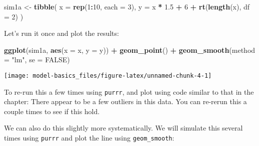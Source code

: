 \documentclass[]{book}
\newenvironment{Shaded}{\begin{snugshade}}{\end{snugshade}}
\newcommand{\DataTypeTok}[1]{\textcolor[rgb]{0.13,0.29,0.53}{#1}}
\newcommand{\DecValTok}[1]{\textcolor[rgb]{0.00,0.00,0.81}{#1}}
\newcommand{\FloatTok}[1]{\textcolor[rgb]{0.00,0.00,0.81}{#1}}
\newcommand{\KeywordTok}[1]{\textcolor[rgb]{0.13,0.29,0.53}{\textbf{#1}}}
\newcommand{\NormalTok}[1]{#1}
\newcommand{\OperatorTok}[1]{\textcolor[rgb]{0.81,0.36,0.00}{\textbf{#1}}}
\newcommand{\OtherTok}[1]{\textcolor[rgb]{0.56,0.35,0.01}{#1}}
\newcommand{\StringTok}[1]{\textcolor[rgb]{0.31,0.60,0.02}{#1}}
\theoremstyle{definition}
\theoremstyle{definition}
\theoremstyle{definition}
\theoremstyle{remark}
\begin{document}
\begin{Shaded}
\begin{Highlighting}[]
\NormalTok{sim1a <-}\StringTok{ }\KeywordTok{tibble}\NormalTok{(}
  \DataTypeTok{x =} \KeywordTok{rep}\NormalTok{(}\DecValTok{1}\OperatorTok{:}\DecValTok{10}\NormalTok{, }\DataTypeTok{each =} \DecValTok{3}\NormalTok{),}
  \DataTypeTok{y =}\NormalTok{ x }\OperatorTok{*}\StringTok{ }\FloatTok{1.5} \OperatorTok{+}\StringTok{ }\DecValTok{6} \OperatorTok{+}\StringTok{ }\KeywordTok{rt}\NormalTok{(}\KeywordTok{length}\NormalTok{(x), }\DataTypeTok{df =} \DecValTok{2}\NormalTok{)}
\NormalTok{)}
\end{Highlighting}
\end{Shaded}

Let's run it once and plot the results:

\begin{Shaded}
\begin{Highlighting}[]
\KeywordTok{ggplot}\NormalTok{(sim1a, }\KeywordTok{aes}\NormalTok{(}\DataTypeTok{x =}\NormalTok{ x, }\DataTypeTok{y =}\NormalTok{ y)) }\OperatorTok{+}
\StringTok{  }\KeywordTok{geom_point}\NormalTok{() }\OperatorTok{+}
\StringTok{  }\KeywordTok{geom_smooth}\NormalTok{(}\DataTypeTok{method =} \StringTok{"lm"}\NormalTok{, }\DataTypeTok{se =} \OtherTok{FALSE}\NormalTok{)}
\end{Highlighting}
\end{Shaded}

\begin{center}\texttt{[image: model-basics\_files/figure-latex/unnamed-chunk-4-1]} \end{center}

To re-run this a few times using \texttt{purrr}, and plot using code
similar to that in the chapter: There appear to be a few outliers in
this data. You can re-rerun this a couple times to see if this hold.

We can also do this slightly more systematically. We will simulate this
several times using \texttt{purrr} and plot the line using
\texttt{geom\_smooth}:
\end{document}
